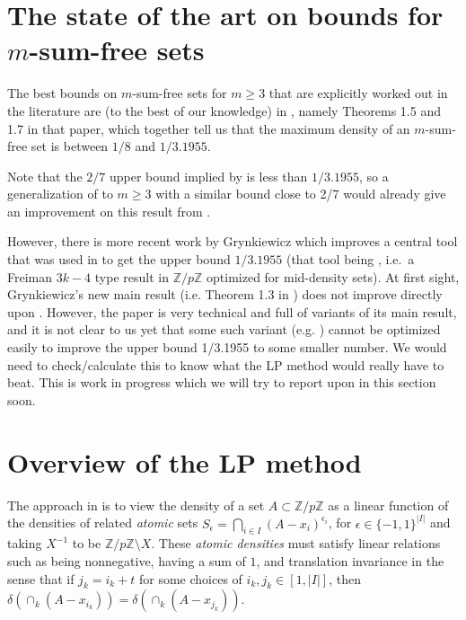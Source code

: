 \documentclass[a4paper,12pt,reqno]{amsart}
\newcommand{\abs}[1]{\left|#1\right|}
\newcommand{\1}{\mathbf{1}}
\newcommand{\0}{\mathbf{0}}
\theoremstyle{definition}
\newcommand{\mb}{\mathbb}
\providecommand{\abs}[1]{\lvert#1\rvert}
\begin{document}
\section{The state of the art on bounds for $m$-sum-free sets}

The best bounds on $m$-sum-free sets for $m\geq 3$ that are explicitly worked out in the literature are (to the best of our knowledge) in \cite{CGG}, namely Theorems 1.5 and 1.7 in that paper, which together tell us that the maximum density of an $m$-sum-free set is between $1/8$ and $1/3.1955$. 

Note that the $2/7$ upper bound implied by \cite[Theorem 1]{LMPV} is less than $1/3.1955$, so a generalization of \cite[Theorem 1]{LMPV} to $m\geq 3$ with a similar bound close to 2/7 would already give an improvement on this result from \cite{CGG}. 

However, there is more recent work \cite{Gryn} by Grynkiewicz which improves a central tool that was used in \cite{CGG} to get the upper bound $1/3.1955$ (that tool being \cite[Theorem 1.4]{CGG}, i.e.\ a Freiman $3k-4$ type result in $\mb{Z}/p\mb{Z}$ optimized for mid-density sets). At first sight, Grynkiewicz's new main result (i.e. Theorem 1.3 in \cite{Gryn}) does not improve directly upon \cite[Theorem 1.4]{CGG}. However, the paper \cite{Gryn} is very technical and full of variants of its main result, and it is not clear to us yet that some such variant (e.g. \cite[Theorem 3.3]{Gryn}) cannot be optimized easily to improve the upper bound 1/3.1955 to some smaller number. We would need to check/calculate this to know what the LP method would really have to beat. This is work in progress which we will try to report upon in this section soon.

\bigskip


\section{Overview of the LP method}

The approach in \cite{LMPV} is to view the density of a set $A \subset \mb{Z}/p\mb{Z}$
as a linear function of the densities of related \emph{atomic} sets $S_{\epsilon} = \bigcap_{i \in I}(A - x_i)^{\epsilon_i}$, for $\epsilon \in \{-1, 1\}^{\abs{I}}$ and taking $X^{-1}$ to be $\mb{Z}/p\mb{Z} \setminus X$. These \emph{atomic densities} must satisfy linear relations such as being nonnegative, having a sum of $1$, and translation invariance in the sense that if $j_k = i_k + t$ for some choices of $i_k, j_k \in [1, \abs{I}]$, then $\delta\left(\cap_k(A - x_{i_k})\right) = \delta\left(\cap_k(A - x_{j_k})\right)$.
\end{document}
